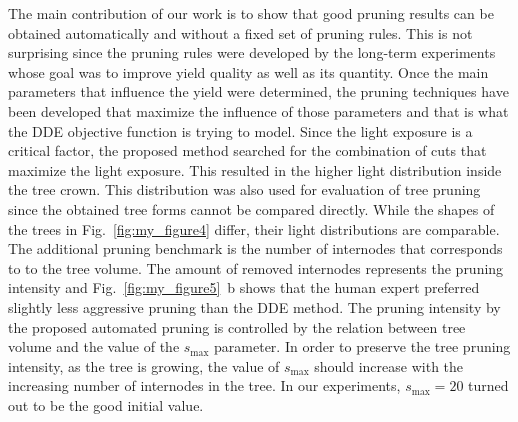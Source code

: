 The main contribution of our work is to show that good pruning results
can be obtained automatically and without a fixed set of pruning rules.
This is not surprising since the pruning rules were developed by the
long-term experiments whose goal was to improve yield quality as well as
its quantity. Once the main parameters that influence the yield were
determined, the pruning techniques have been developed that maximize the
influence of those parameters and that is what the DDE objective
function is trying to model. Since the light exposure is a critical
factor, the proposed method searched for the combination of cuts that
maximize the light exposure. This resulted in the higher light
distribution inside the tree crown. This distribution was also used for
evaluation of tree pruning since the obtained tree forms cannot be
compared directly. While the shapes of the trees in Fig.~\ref{fig:my_figure4} differ,
their light distributions are comparable. The additional pruning
benchmark is the number of internodes that corresponds to to the tree volume. 
The amount of removed internodes represents  the
pruning intensity and Fig.~\ref{fig:my_figure5}~b shows that the human expert preferred
slightly less aggressive pruning than the DDE method. The pruning
intensity by the proposed automated pruning is controlled by the
relation between tree volume and the value of the \(s_{\mathrm{\max}}\)
parameter. In order to preserve the tree pruning intensity, as the tree
is growing, the value of \(s_{\mathrm{\max}}\) should increase with the
increasing number of internodes in the tree. In our experiments, \(s_{\mathrm{\max}}=20\)
turned out to be the good initial value.

